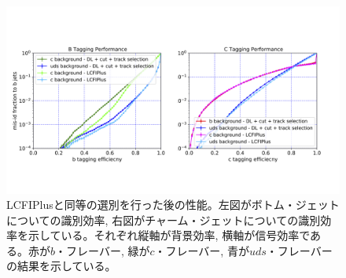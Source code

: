 \begin{figure}[htbp]
 \centering
 \includegraphics[trim = 0 150 0 200, width=1.0\textwidth, clip]{Figure/5Comparison/5-2-3-2FlavorTaggingROCCurve.png}
 \caption[LCFIPlusと同等の選別を行った後の性能]{LCFIPlusと同等の選別を行った後の性能。左図がボトム・ジェットについての識別効率, 右図がチャーム・ジェットについての識別効率を示している。それぞれ縦軸が背景効率, 横軸が信号効率である。赤が$b$・フレーバー, 緑が$c$・フレーバー, 青が$uds$・フレーバーの結果を示している。}
 \label{5-2-3-2FlavorTaggingROCCurve}
\end{figure}










